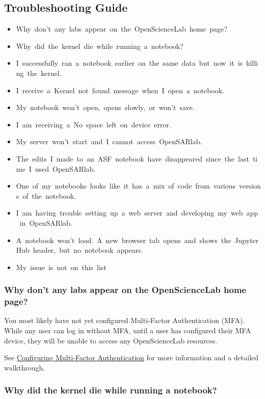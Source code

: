 \subsection{Troubleshooting Guide}

\newline
\begin{itemize}
\item Why~don’t~any~labs~appear~on~the~OpenScienceLab~home~page?
\item Why~did~the~kernel~die~while~running~a~notebook?
\item I~successfully~ran~a~notebook~earlier~on~the~same~data~but~now~it~is~killing~the~kernel.
\item I~receive~a~Kernel~not~found~message~when~I~open~a~notebook.
\item My~notebook~won’t~open,~opens~slowly,~or~won’t~save.
\item I~am~receiving~a~No~space~left~on~device~error.
\item My~server~won’t~start~and~I~cannot~access~OpenSARlab.
\item The~edits~I~made~to~an~ASF~notebook~have~disappeared~since~the~last~time~I~used~OpenSARlab.
\item One~of~my~notebooks~looks~like~it~has~a~mix~of~code~from~various~versions~of~the~notebook.
\item I~am~having~trouble~setting~up~a~web~server~and~developing~my~web~app~in~OpenSARlab.
\item A~notebook~won’t~load.~A~new~browser~tab~opens~and~shows~the~JupyterHub~header,~but~no~notebook~appears.
\item My~issue~is~not~on~this~list
\end{itemize}

\subsubsection{Why don't any labs appear on the OpenScienceLab home page?}\label{Why-dont-any-labs-appear-on-the-OpenScienceLab-home-page}

You most likely have not yet configured Multi-Factor Authentication (MFA). While
any user can log in without MFA, until a user has configured their MFA device,
they will be unable to access any OpenScienceLab resources.

See \href{/mfa}{Configuring Multi-Factor Authentication} for more information and
a detailed walkthrough.

\subsubsection{Why did the kernel die while running a notebook?}\label{Why-did-the-kernel-die-while-running-a-notebook}

